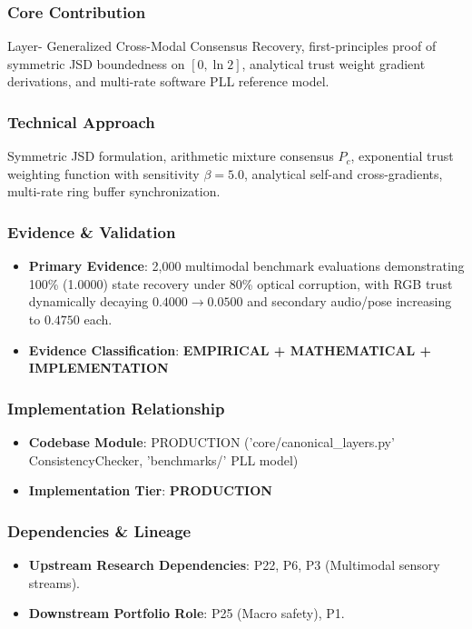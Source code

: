 \documentclass[11pt,letterpaper]{article}
\begin{document}
\subsubsection{Core Contribution}
Layer- Generalized Cross-\allowbreak Modal Consensus Recovery, first-\allowbreak principles proof of symmetric JSD boundedness on $[0, \ln 2]$, analytical trust weight gradient derivations, and multi-\allowbreak rate software PLL reference model.

\subsubsection{Technical Approach}
Symmetric JSD formulation, arithmetic mixture consensus $P_c$, exponential trust weighting function with sensitivity $\beta=5.0$, analytical self-\allowbreak  and cross-\allowbreak gradients, multi-\allowbreak rate ring buffer synchronization.

\subsubsection{Evidence \& Validation}
\begin{itemize}[leftmargin=*]
    \item \textbf{Primary Evidence}: 2,000 multimodal benchmark evaluations demonstrating 100\% (1.0000) state recovery under 80\% optical corruption, with RGB trust dynamically decaying $0.4000 \to 0.0500$ and secondary audio/\allowbreak pose increasing to $0.4750$ each.
    \item \textbf{Evidence Classification}: \textbf{EMPIRICAL + MATHEMATICAL + IMPLEMENTATION}
\end{itemize}

\subsubsection{Implementation Relationship}
\begin{itemize}[leftmargin=*]
    \item \raggedright \textbf{Codebase Module}: PRODUCTION ('core/\allowbreak canonical\_\allowbreak layers.py' ConsistencyChecker, 'benchmarks/\allowbreak ' PLL model)
    \item \textbf{Implementation Tier}: \textbf{PRODUCTION}
\end{itemize}

\subsubsection{Dependencies \& Lineage}
\begin{itemize}[leftmargin=*]
    \item \textbf{Upstream Research Dependencies}: P22, P6, P3 (Multimodal sensory streams).
    \item \textbf{Downstream Portfolio Role}: P25 (Macro safety), P1.
\end{itemize}
\end{document}
